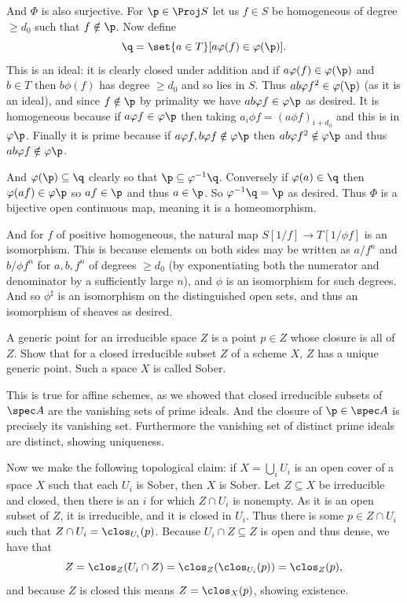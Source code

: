     And $\Phi$ is also surjective.
    For $\p\in\Proj S$ let us $f\in S$ be homogeneous of degree $\geq d_0$ such that $f\notin\p$.
    Now define
    $$ \q = \set{a\in T}[a\phi(f)\in\phi(\p)] . $$
    This is an ideal: it is clearly closed under addition and if $a\phi(f)\in\phi(\p)$ and $b\in T$ then $b\phi(f)$ has degree $\geq d_0$ and so lies in $S$.
    Thus $ab\phi f^2\in\phi(\p)$ (as it is an ideal), and since $f\notin\p$ by primality we have $ab\phi f\in\phi\p$ as desired.
    It is homogeneous because if $a\phi f\in\phi\p$ then taking $a_i\phi f=(a\phi f)_{i+d_0}$ and this is in $\phi\p$.
    Finally it is prime because if $a\phi f,b\phi f\notin\phi\p$ then $ab\phi f^2\notin\phi\p$ and thus $ab\phi f\notin\phi\p$.

    And $\phi(\p)\subseteq\q$ clearly so that $\p\subseteq\phi^{-1}\q$.
    Conversely if $\phi(a)\in\q$ then $\phi(af)\in\phi\p$ so $af\in\p$ and thus $a\in\p$.
    So $\phi^{-1}\q=\p$ as desired.
    Thus $\Phi$ is a bijective open continuous map, meaning it is a homeomorphism.

    And for $f$ of positive homogeneous, the natural map $S[1/f]\to T[1/\phi f]$ is an isomorphism.
    This is because elements on both sides may be written as $a/f^n$ and $b/\phi f^n$ for $a,b,f^n$ of degrees $\geq d_0$ (by exponentiating both the numerator and denominator
    by a sufficiently large $n$), and $\phi$ is an isomorphism for such degrees.
    And so $\phi^\sharp$ is an isomorphism on the distinguished open sets, and thus an isomorphism of sheaves as desired.
\eenum

\bprob[title={Hartshorne II.2.9}]

    A {\emphcolor generic point} for an irreducible space $Z$ is a point $p\in Z$ whose closure is all of $Z$.
    Show that for a closed irreducible subset $Z$ of a scheme $X$, $Z$ has a unique generic point.
    Such a space $X$ is called {\emphcolor Sober}.

\eprob

This is true for affine schemes, as we showed that closed irreducible subsets of $\spec A$ are the vanishing sets of prime ideals.
And the closure of $\p\in\spec A$ is precisely its vanishing set.
Furthermore the vanishing set of distinct prime ideals are distinct, showing uniqueness.

Now we make the following topological claim: if $X=\bigcup_iU_i$ is an open cover of a space $X$ such that each $U_i$ is Sober, then
$X$ is Sober.
Let $Z\subseteq X$ be irreducible and closed, then there is an $i$ for which $Z\cap U_i$ is nonempty.
As it is an open subset of $Z$, it is irreducible, and it is closed in $U_i$.
Thus there is some $p\in Z\cap U_i$ such that $Z\cap U_i=\clos_{U_i}(p)$.
Because $U_i\cap Z\subseteq Z$ is open and thus dense, we have that
$$ Z = \clos_Z(U_i\cap Z) = \clos_Z(\clos_{U_i}(p)) = \clos_Z(p) , $$
and because $Z$ is closed this means $Z=\clos_X(p)$, showing existence.

